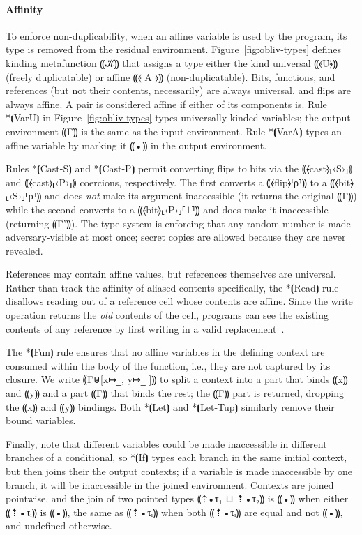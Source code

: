 \paragraph*{Affinity}
%
To enforce non-duplicability, when an affine variable is used by the
program, its type is removed from the residual
environment. Figure~\ref{fig:obliv-types} defines kinding metafunction ⸨𝒦⸩
that assigns a type either the kind universal ⸨⦑U⦒⸩ (freely duplicatable) or
affine ⸨⦑ A ⦒⸩ (non-duplicatable). Bits, functions, and references (but not
their contents, necessarily) are always universal,
and flips are always affine. A pair is considered affine if either of
its components is. Rule *⦗VarU⦘ in Figure~\ref{fig:obliv-types} types
universally-kinded variables; the output environment ⸨Γ⸩ is the same
as the input environment. Rule *⦗VarA⦘ types an affine variable by
marking it ⸨•⸩ in the output environment.

Rules *⦗Cast-S⦘ and *⦗Cast-P⦘ permit converting flips to bits
via the ⸨⦑cast⦒⸤‹S›⸥⸩ and ⸨⦑cast⦒⸤‹P›⸥⸩ coercions, respectively. The
first converts a ⸨⦑flip⦒⸢ρ⸣⸩ to a ⸨⦑bit⦒⸤‹S›⸥⸢ρ⸣⸩ and does \emph{not} make
its argument inaccessible (it returns the original ⸨Γ⸩) while the
second converts to a ⸨⦑bit⦒⸤‹P›⸥⸢⊥⸣⸩ and does make it inaccessible
(returning ⸨Γ'⸩). The type system is enforcing that any
random number is made adversary-visible at most once; secret copies
are allowed because they are never revealed.

References may contain affine values, but references themselves are
universal. Rather than track the affinity of aliased contents
specifically, the *⦗Read⦘ rule disallows reading out of a reference
cell whose contents are affine. Since the write operation returns the
\emph{old} contents of the cell, programs can see the existing
contents of any reference by first writing in a valid
replacement~\cite{Baker:1992:LLL:142137.142162}.

The *⦗Fun⦘ rule ensures that no affine variables in the defining
context are consumed within the body of the function, i.e., they are
not captured by its closure. We write ⸨Γ⊎[x↦‗, y↦‗ ]⸩ to split a
context into a part that binds ⸨x⸩ and ⸨y⸩ and a part ⸨Γ⸩ that binds the rest;
the ⸨Γ⸩ part is returned, dropping the ⸨x⸩ and ⸨y⸩
bindings. Both *⦗Let⦘ and *⦗Let-Tup⦘ similarly remove their bound
variables.

Finally, note that different variables could be made inaccessible in
different branches of a conditional, so *⦗If⦘ types each branch in the
same initial context, but then joins their the output contexts; if a
variable is made inaccessible by one branch, it will be inaccessible
in the joined environment. Contexts are joined pointwise, and the join of two
pointed types ⸨⇡•τ₁ ⊔ ⇡•τ₂⸩ is ⸨•⸩ when either ⸨⇡•τᵢ⸩ is ⸨•⸩, the same as
⸨⇡•τᵢ⸩ when both ⸨⇡•τᵢ⸩ are equal and not ⸨•⸩, and undefined otherwise.

